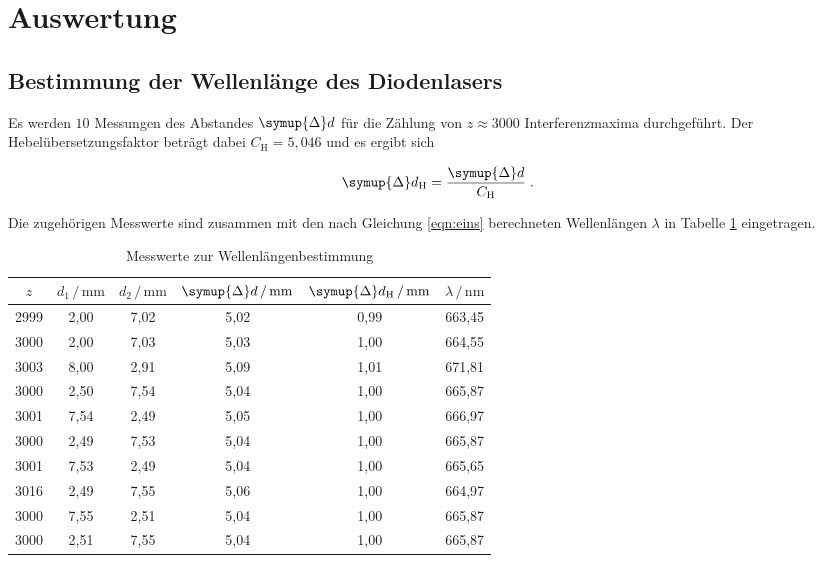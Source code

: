 \section{Auswertung}
\label{sec:Auswertung}

\subsection{Bestimmung der Wellenlänge des Diodenlasers}

Es werden $10$ Messungen des Abstandes $\symup{\Delta}d$ für die Zählung von $z \approx 3000$
Interferenzmaxima durchgeführt. Der Hebelübersetzungsfaktor beträgt dabei $C_\text{H} = 5,046$
und es ergibt sich 

\begin{equation}
    \symup{\Delta} d_\text{H} = \frac{\symup{\Delta}d}{C_\text{H}} \; .
\end{equation}

Die zugehörigen Messwerte sind zusammen mit den nach Gleichung \eqref{eqn:eins} berechneten
Wellenlängen $\lambda$ in Tabelle \ref{tab:mess1} eingetragen.

\begin{table}
    \centering
    \caption{Messwerte zur Wellenlängenbestimmung}
    \label{tab:mess1}
    \begin{tabular}{c c c c c c}
    \toprule
    $z$ & $d_1 \,/\, \si{\milli\meter}$ & $d_2 \,/\, \si{\milli\meter}$
    & $\symup{\Delta}d \,/\, \si{\milli\meter}$ & $\symup{\Delta}d_\text{H} \,/\, \si{\milli\meter}$
    & $\lambda \,/\, \si{\nano\meter}$\\
    \midrule 
        2999 & 2,00 & 7,02 & 5,02 & 0,99 & 663,45 \\
        3000 & 2,00 & 7,03 & 5,03 & 1,00 & 664,55 \\
        3003 & 8,00 & 2,91 & 5,09 & 1,01 & 671,81 \\
        3000 & 2,50 & 7,54 & 5,04 & 1,00 & 665,87 \\
        3001 & 7,54 & 2,49 & 5,05 & 1,00 & 666,97 \\
        3000 & 2,49 & 7,53 & 5,04 & 1,00 & 665,87 \\
        3001 & 7,53 & 2,49 & 5,04 & 1,00 & 665,65 \\
        3016 & 2,49 & 7,55 & 5,06 & 1,00 & 664,97 \\
        3000 & 7,55 & 2,51 & 5,04 & 1,00 & 665,87 \\
        3000 & 2,51 & 7,55 & 5,04 & 1,00 & 665,87 \\
    \bottomrule
    \end{tabular}
    \end{table}

